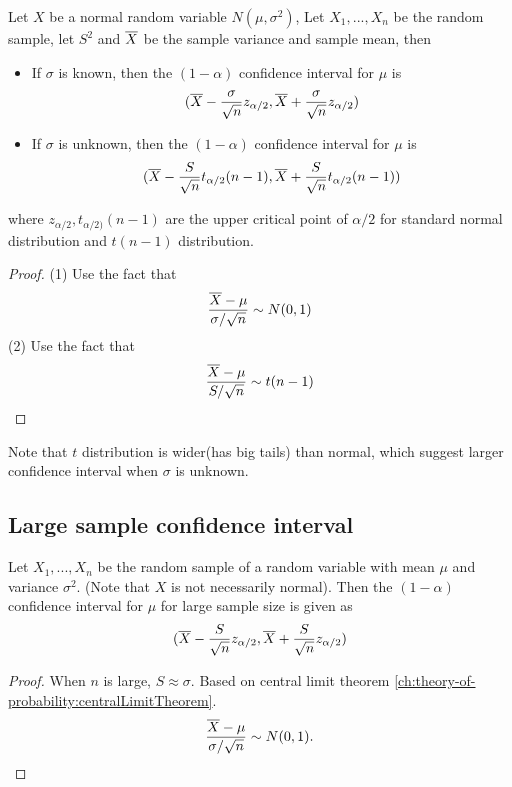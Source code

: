 \begin{refsection}
\begin{lemma}
Let $X$ be a normal random variable $N(\mu,\sigma^2)$, Let $X_1,...,X_n$ be the random sample, let $S^2$ and $\overline{X}$ be the sample variance and sample mean, then
\begin{itemize}
	\item If $\sigma$ is known, then the $(1-\alpha)$ confidence interval for $\mu$ is
	$$(\overline{X} - \frac{\sigma}{\sqrt{n}}z_{\alpha/2},\overline{X} + \frac{\sigma}{\sqrt{n}}z_{\alpha/2})$$
	\item If $\sigma$ is unknown, then the $(1-\alpha)$ confidence interval for $\mu$ is
	$$(\overline{X} - \frac{S}{\sqrt{n}}t_{\alpha/2}(n-1),\overline{X} + \frac{S}{\sqrt{n}}t_{\alpha/2}(n-1))$$
\end{itemize}
where $z_{\alpha/2},t_{\alpha/2)}(n-1)$ are the upper critical point of $\alpha/2$ for standard normal distribution and $t(n-1)$ distribution.
\end{lemma}
\begin{proof}
(1) Use the fact that 
$$\frac{\overline{X}-\mu}{\sigma/\sqrt{n}} \sim N(0,1)$$
(2) Use the fact that
$$\frac{\overline{X}-\mu}{S/\sqrt{n}} \sim t(n-1)$$
\end{proof}

\begin{remark}
Note that $t$ distribution is wider(has big tails) than normal, which suggest larger confidence interval when $\sigma$ is unknown.
\end{remark}



\subsection{Large sample confidence interval}
\begin{lemma}\cite[220]{hoggintroduction}
Let $X_1,...,X_n$ be the random sample of a random variable with mean $\mu$ and variance $\sigma^2$. (Note that $X$ is not necessarily normal). Then the $(1-\alpha)$ confidence interval for $\mu$ for large sample size is given as
	$$(\overline{X} - \frac{S}{\sqrt{n}}z_{\alpha/2},\overline{X} + \frac{S}{\sqrt{n}}z_{\alpha/2})$$
\end{lemma}
\begin{proof}
When $n$ is large, $S \approx \sigma$. Based on central limit theorem \autoref{ch:theory-of-probability:centralLimitTheorem}.
$$\frac{\overline{X} - \mu}{\sigma/\sqrt{n}} \sim N(0,1).$$
\end{proof}





\end{refsection}
